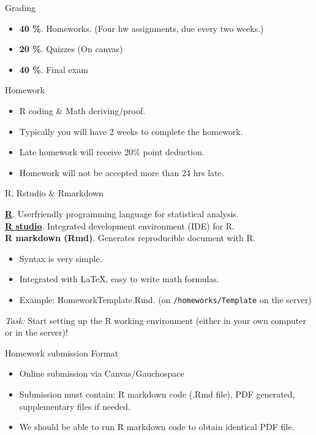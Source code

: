 \documentclass[10pt]{beamer}
\begin{document}
\begin{frame}{Grading}
\large
\begin{itemize}
   \item {\bf 40 \%}. Homeworks. (Four hw assignments, due every two weeks.)
   \item {\bf 20 \%}. Quizzes (On canvas)
   \item {\bf 40 \%}. Final exam
\end{itemize}
    
\end{frame}

\begin{frame}{Homework}

\begin{itemize}
\large
   \item R coding \& Math deriving/proof.
   \item Typically you will have 2 weeks to complete the homework.
   \item Late homework will receive 20\% point deduction.
   \item Homework will not be accepted more than 24 hrs late.
\end{itemize}
    
\end{frame}

\begin{frame}{R, Rstudio \& Rmarkdown}

\large
\href{https://cloud.r-project.org}{\bf R}. User\-friendly programming language for statistical analysis.\\
\href{http://www.rstudio.com/download}{\bf R studio}. Integrated development environment (IDE) for R.\\
 {\bf R markdown (Rmd)}. Generates reproducible document with R.

 \begin{itemize}
     \item Syntax is very simple.
     \item Integrated with LaTeX, easy to write math formulas.
     \item Example: HomeworkTemplate.Rmd. (on \texttt{/homeworks/Template} on the server)
 \end{itemize}
 {\em Task: } Start setting up the R working environment (either in your own computer or in the server)!
\end{frame}

\begin{frame}{Homework submission Format}
\large
\begin{itemize}
    \item Online submission via Canvas/Gauchospace
    \item Submission must contain: R markdown code (.Rmd file), PDF generated, supplementary files if needed.
    \item We should be able to run R markdown code to obtain identical PDF file.
\end{itemize}


    
\end{frame}
\end{document}
